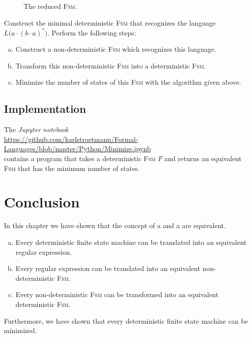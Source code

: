 \begin{figure}[!ht]
  \centering
   \caption{The reduced \textsc{Fsm}.}
  \label{fig:gleichwertig.dot}
\end{figure}



\exerciseEng
Construct the minimal deterministic  \textsc{Fsm} that recognizes the language 
$L\bigl(a \cdot (b \cdot a)^*\bigr)$.  Perform the following steps:
\begin{enumerate}[(a)]
\item Construct a non-deterministic \textsc{Fsm} which recognizes this language.
\item Transform this non-deterministic \textsc{Fsm} into a deterministic \textsc{Fsm}.
\item Minimize the number of states of this \textsc{Fsm} with the algorithm given above.
\end{enumerate}

\subsection{Implementation}
The \textsl{Jupyter notebook} 
\\[0.2cm]
\hspace*{1.3cm}
\href{https://github.com/karlstroetmann/Formal-Languages/blob/master/Python/DFA-2-RegExp.ipynb}{https://github.com/karlstroetmann/Formal-Languages/blob/master/Python/Minimize.ipynb}
\\[0.2cm]
contains a program that takes a deterministic \textsc{Fsm} $F$ and returns an equivalent \textsc{Fsm} that has
the minimum number of states.


\section{Conclusion}
In this chapter we have shown that the concept of a 
and a  are equivalent.
\begin{enumerate}[(a)]
\item Every deterministic finite state machine can be translated into an equivalent regular expression.
\item Every regular expression can be translated into an equivalent non-deterministic \textsc{Fsm}.
\item Every non-deterministic \textsc{Fsm} can be transformed into an equivalent
      deterministic \textsc{Fsm}.
\end{enumerate}
Furthermore, we have shown that every deterministic finite state machine can be minimized.

